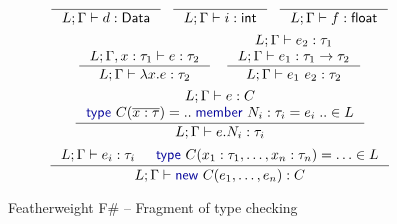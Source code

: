 \documentclass[10pt,preprint,blind,clearpagebib]{sigplanconf}
\newcommand{\kvd}[1]{\textnormal{\textcolor{kvdclr}{\sffamily #1}}}
\newcommand{\ident}[1]{\textnormal{\sffamily #1}}
\begin{document}

\begin{figure}
\noindent  
\begin{equation*}
\inference
  {~}
  {L; \Gamma \vdash d : \ident{Data}}
~~
\inference
  {~}
  {L; \Gamma \vdash i : \ident{int}}
~~
\inference
  {~}
  {L; \Gamma \vdash f : \ident{float}}
\end{equation*}
\vspace{0.25em}
\begin{equation*}
\inference
  {L; \Gamma, x : \tau_1 \vdash e : \tau_2}
  {L; \Gamma \vdash \lambda x.e : \tau_2}
\quad
\inference
  {L; \Gamma \vdash e_2 : \tau_1 \\
   L; \Gamma \vdash e_1 : \tau_1 \rightarrow \tau_2}
  {L; \Gamma \vdash e_1~e_2 : \tau_2}
\end{equation*}
\vspace{0.5em}
\begin{equation*}
\inference
  {L; \Gamma \vdash e : C \\ \kvd{type}~C(\overline{x:\tau}) = ..\;\kvd{member}~N_i : \tau_i = e_i\;.. \in L}
  {L; \Gamma \vdash e.N_i:\tau_i}
\end{equation*}
\vspace{0.25em}
\begin{equation*}
\inference
  {L; \Gamma \vdash e_i : \tau_i & \kvd{type}~C(x_1:\tau_1, \ldots, x_n:\tau_n) = \ldots \in L}
  {L; \Gamma \vdash \kvd{new}~C(e_1, \ldots, e_n):C}
\end{equation*}

\caption{Featherweight F\# -- Fragment of type checking}
\label{fig:ff-typecheck}
\end{figure}

\end{document}
